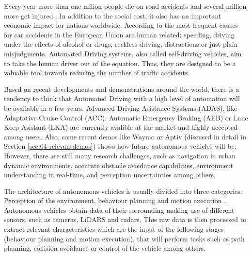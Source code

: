 Every year more than one milion people die on road accidents and several 
million more get injured \cite{world2015global}. In addition to the social cost, it also has an
important economic impact for nations worldwide. According to 
\cite{Thomas2013} the most frequent causes for car accidents in the
European Union are human related: speeding, driving under the effects of
alcohol or drugs, reckless driving, distractions or just plain misjudgments.
Automated Driving systems, also called self-driving vehicles, aim to take the 
human driver out of the equation. Thus, they are designed to be a valuable tool
towards reducing the number of traffic accidents.

Based on recent developments and demonstrations around the world, there is a 
tendency to think that Automated Driving with a high level of automation will 
be available in a few years. 
Advanced Driving Asistance Systems (ADAS), like Adaptative Cruise Control 
(ACC), Automatic Emergency Braking (AEB) or Lane Keep Asistant (LKA) are
currently avalible at the market and highly accepted among users. 
Also, some recent demos like Waymo or Aptiv 
(discused in detail in Section \ref{sec:04-relevantdemos}) shows how future 
autonomous vehicles will be.
However, there are still many research challenges, such as navigation in urban 
dynamic environments, accurate obstacle avoidance capabilities, environment 
understanding in real-time, and perception uncertainties among others.
%

The architecture of autonomous vehicles is usually divided into three 
categories: Perception of the environment, behaviour planning and motion 
execution \cite{behere2015functional}. Autonomous 
vehicles obtain data of their sorrounding making use 
of different sensors, such as cameras, LiDARS and radars. This raw data is then 
processed to extract relevant characteristics which are the input of the 
following stages (behaviour planning and motion execution), that will 
perform tasks such as path planning, collision avoidance or control of the 
vehicle among others. 

